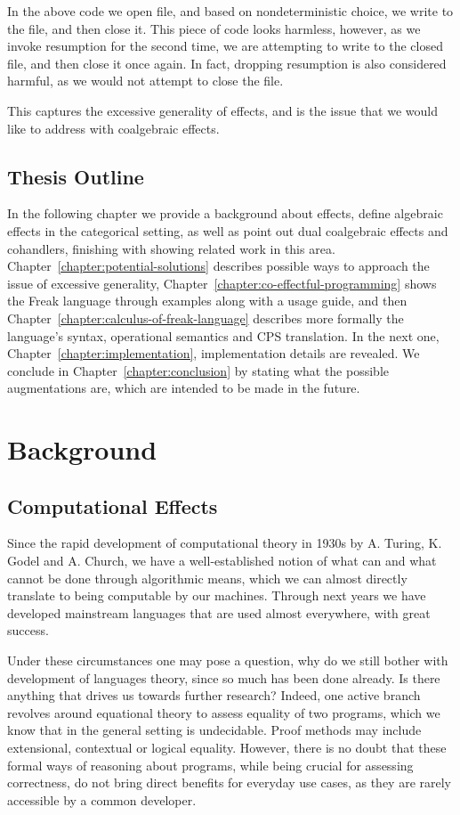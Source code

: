 \documentclass[declaration,shortabstract]{iithesis}
\theoremstyle{definition} \newtheorem{definition}{Definition}[chapter]
\theoremstyle{remark} \newtheorem{remark}[definition]{Observation}
\theoremstyle{plain} \newtheorem{theorem}[definition]{Theorem}
\theoremstyle{plain} \newtheorem{lemma}[definition]{Lemma}
\begin{document}
In the above code we open file, and based on nondeterministic choice, we write
to the file, and then close it. This piece of code looks harmless, however, as
we invoke resumption for the second time, we are attempting to write to the
closed file, and then close it once again. In fact, dropping resumption is also
considered harmful, as we would not attempt to close the file.

This captures the excessive generality of effects, and is the issue that we
would like to address with coalgebraic effects.

\section{Thesis Outline}


In the following chapter we provide a background about effects, define algebraic
effects in the categorical setting, as well as point out dual coalgebraic effects
and cohandlers, finishing with showing related work in this area.
Chapter~\ref{chapter:potential-solutions} describes possible ways to approach
the issue of excessive generality, Chapter~\ref{chapter:co-effectful-programming}
shows the Freak language through examples along with a usage guide, and then
Chapter~\ref{chapter:calculus-of-freak-language} describes more formally the
language's syntax, operational semantics and CPS translation. In the next one,
Chapter~\ref{chapter:implementation}, implementation details are revealed.
We conclude in Chapter~\ref{chapter:conclusion} by stating what the possible
augmentations are, which are intended to be made in the future.

\chapter{Background}\label{chapter:background}

\section{Computational Effects}

Since the rapid development of computational theory in 1930s by A. Turing,
K. Godel and A. Church, we have a well-established notion of what can and what
cannot be done through algorithmic means, which we can almost directly translate
to being computable by our machines. Through next years we have developed
mainstream languages that are used almost everywhere, with great success.

Under these circumstances one may pose a question, why do we still bother with
development of languages theory, since so much has been done already. Is there
anything that drives us towards further research? Indeed, one active branch
revolves around equational theory to assess equality of two programs, which we
know that in the general setting is undecidable. Proof methods may include
extensional, contextual or logical equality. However, there is no doubt that
these formal ways of reasoning about programs, while being crucial for assessing
correctness, do not bring direct benefits for everyday use cases, as they are
rarely accessible by a common developer.
\end{document}
